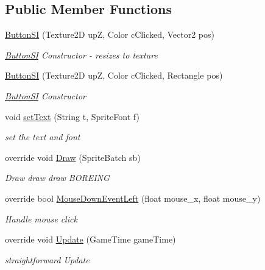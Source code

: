\subsection*{Public Member Functions}
\begin{DoxyCompactItemize}
\item 
\mbox{\hyperlink{class_r_c___framework_1_1_button_s_i_af419ab3d1513150939d673226bb4b3c8}{Button\+SI}} (Texture2D upZ, Color c\+Clicked, Vector2 pos)
\begin{DoxyCompactList}\small\item\em \mbox{\hyperlink{class_r_c___framework_1_1_button_s_i}{Button\+SI}} Constructor -\/ resizes to texture \end{DoxyCompactList}\item 
\mbox{\hyperlink{class_r_c___framework_1_1_button_s_i_aa1e864edccf775be2a5e87d1ac02b89a}{Button\+SI}} (Texture2D upZ, Color c\+Clicked, Rectangle pos)
\begin{DoxyCompactList}\small\item\em \mbox{\hyperlink{class_r_c___framework_1_1_button_s_i}{Button\+SI}} Constructor \end{DoxyCompactList}\item 
void \mbox{\hyperlink{class_r_c___framework_1_1_button_s_i_a4e0e489ebc76dd36dd5a6f0750dbe78b}{set\+Text}} (String t, Sprite\+Font f)
\begin{DoxyCompactList}\small\item\em set the text and font \end{DoxyCompactList}\item 
override void \mbox{\hyperlink{class_r_c___framework_1_1_button_s_i_a9527749f48994c13be5b72b2cb370b29}{Draw}} (Sprite\+Batch sb)
\begin{DoxyCompactList}\small\item\em Draw draw draw B\+O\+R\+E\+I\+NG \end{DoxyCompactList}\item 
override bool \mbox{\hyperlink{class_r_c___framework_1_1_button_s_i_a4323f8436749655b240fa35caa15daa6}{Mouse\+Down\+Event\+Left}} (float mouse\+\_\+x, float mouse\+\_\+y)
\begin{DoxyCompactList}\small\item\em Handle mouse click \end{DoxyCompactList}\item 
override void \mbox{\hyperlink{class_r_c___framework_1_1_button_s_i_a28efd8765e3ec06c727477352d1e5c01}{Update}} (Game\+Time game\+Time)
\begin{DoxyCompactList}\small\item\em straightforward Update \end{DoxyCompactList}\end{DoxyCompactItemize}
